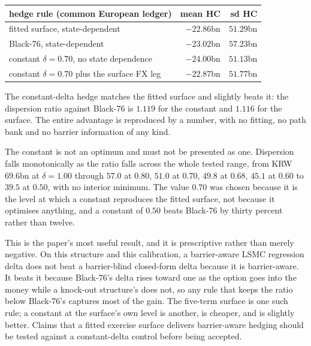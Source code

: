 \documentclass[11pt,a4paper]{article}
\begin{document}
\begin{center}
\small
\begin{tabular}{lrr}
\toprule
hedge rule (common European ledger) & mean HC & sd HC \\
\midrule
fitted surface, state-dependent & $-22.86$bn & $51.29$bn \\
Black-76, state-dependent & $-23.02$bn & $57.23$bn \\
constant $\delta=0.70$, no state dependence & $-24.00$bn & $51.13$bn \\
constant $\delta=0.70$ plus the surface FX leg & $-22.87$bn & $51.77$bn \\
\bottomrule
\end{tabular}
\end{center}

\noindent The constant-delta hedge matches the fitted surface and slightly beats it: the dispersion ratio against Black-76 is $1.119$ for the constant and $1.116$ for the surface. The entire advantage is reproduced by a number, with no fitting, no path bank and no barrier information of any kind.

The constant is not an optimum and must not be presented as one. Dispersion falls monotonically as the ratio falls across the whole tested range, from KRW $69.6$bn at $\delta=1.00$ through $57.0$ at $0.80$, $51.0$ at $0.70$, $49.8$ at $0.68$, $45.1$ at $0.60$ to $39.5$ at $0.50$, with no interior minimum. The value $0.70$ was chosen because it is the level at which a constant reproduces the fitted surface, not because it optimises anything, and a constant of $0.50$ beats Black-76 by thirty percent rather than twelve.

This is the paper's most useful result, and it is prescriptive rather than merely negative. On this structure and this calibration, a barrier-aware LSMC regression delta does not beat a barrier-blind closed-form delta because it is barrier-aware. It beats it because Black-76's delta rises toward one as the option goes into the money while a knock-out structure's does not, so any rule that keeps the ratio below Black-76's captures most of the gain. The five-term surface is one such rule; a constant at the surface's own level is another, is cheaper, and is slightly better. Claims that a fitted exercise surface delivers barrier-aware hedging should be tested against a constant-delta control before being accepted.
\end{document}
